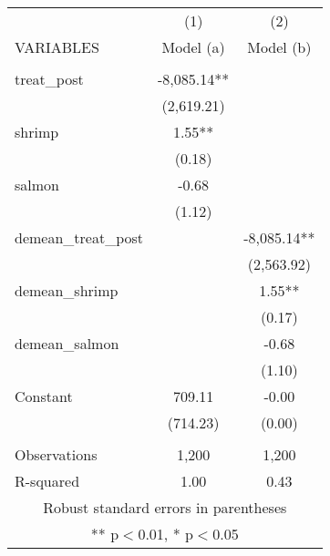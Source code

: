 \begin{tabular}{lcc} \hline
 & (1) & (2) \\
VARIABLES & Model (a) & Model (b) \\ \hline
 &  &  \\
treat\_post & -8,085.14** &  \\
 & (2,619.21) &  \\
shrimp & 1.55** &  \\
 & (0.18) &  \\
salmon & -0.68 &  \\
 & (1.12) &  \\
demean\_treat\_post &  & -8,085.14** \\
 &  & (2,563.92) \\
demean\_shrimp &  & 1.55** \\
 &  & (0.17) \\
demean\_salmon &  & -0.68 \\
 &  & (1.10) \\
Constant & 709.11 & -0.00 \\
 & (714.23) & (0.00) \\
 &  &  \\
Observations & 1,200 & 1,200 \\
 R-squared & 1.00 & 0.43 \\ \hline
\multicolumn{3}{c}{ Robust standard errors in parentheses} \\
\multicolumn{3}{c}{ ** p$<$0.01, * p$<$0.05} \\
\end{tabular}
